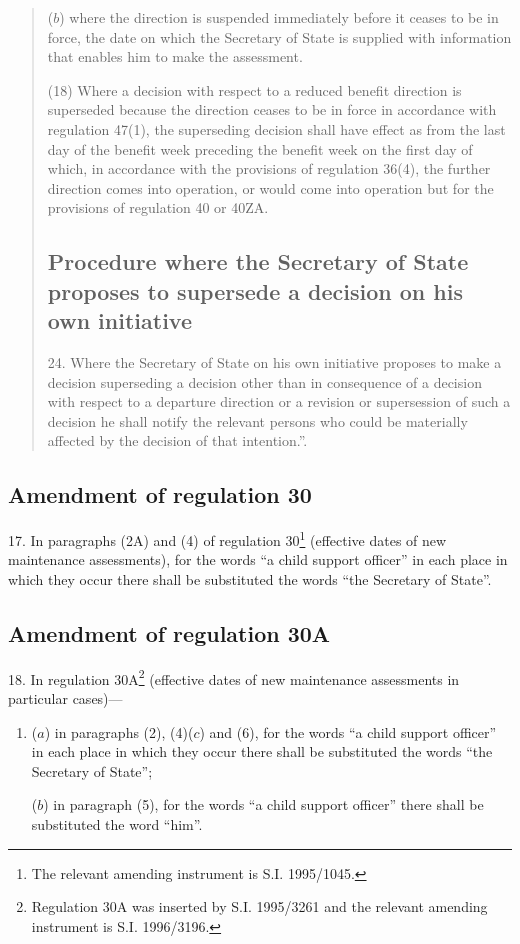 \documentclass[12pt,a4paper]{article}
\begin{document}
\begin{quotation}
\begin{enumerate}
($b$) where the direction is suspended immediately before it ceases to be in force, the date on which the Secretary of State is supplied with information that enables him to make the assessment.
\end{enumerate}

(18) Where a decision with respect to a reduced benefit direction is superseded because the direction ceases to be in force in accordance with regulation 47(1), the superseding decision shall have effect as from the last day of the benefit week preceding the benefit week on the first day of which, in accordance with the provisions of regulation 36(4), the further direction comes into operation, or would come into operation but for the provisions of regulation 40 or 40ZA.

\subsection*{Procedure where the Secretary of State proposes to supersede a decision on his own initiative}

24.  Where the Secretary of State on his own initiative proposes to make a decision superseding a decision other than in consequence of a decision with respect to a departure direction or a revision or supersession of such a decision he shall notify the relevant persons who could be materially affected by the decision of that intention.”.
\end{quotation}

\subsection[17. Amendment of regulation 30]{Amendment of regulation 30}

17.  In paragraphs (2A) and (4) of regulation 30\footnote{\frenchspacing The relevant amending instrument is S.I. 1995/1045.} (effective dates of new maintenance assessments), for the words “a child support officer” in each place in which they occur there shall be substituted the words “the Secretary of State”.

\subsection[18. Amendment of regulation 30A]{Amendment of regulation 30A}

18.  In regulation 30A\footnote{\frenchspacing Regulation 30A was inserted by S.I. 1995/3261 and the relevant amending instrument is S.I. 1996/3196.} (effective dates of new maintenance assessments in particular cases)---
\begin{enumerate}\item[]
($a$) in paragraphs (2), (4)($c$) and (6), for the words “a child support officer” in each place in which they occur there shall be substituted the words “the Secretary of State”;

($b$) in paragraph (5), for the words “a child support officer” there shall be substituted the word “him”.
\end{enumerate}
\end{document}
